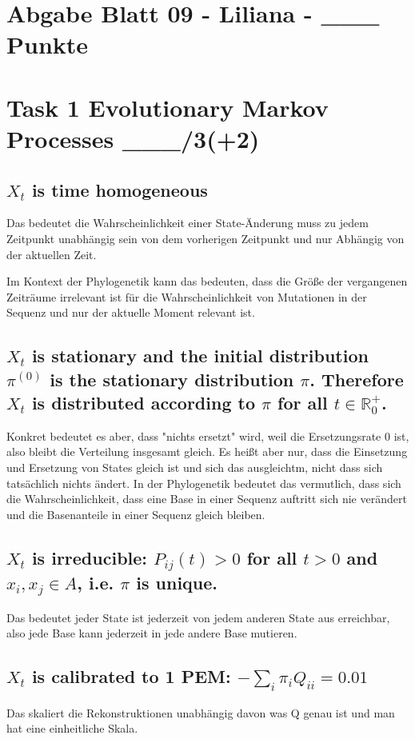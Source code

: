 \newpage \section{Abgabe Blatt 09 - Liliana - \_\_\_ Punkte}
\section*{Task 1 Evolutionary Markov Processes \_\_\_/3(+2)}
\subsection{$X_t$ is time homogeneous}
Das bedeutet die Wahrscheinlichkeit einer State-Änderung muss zu jedem Zeitpunkt unabhängig sein von dem vorherigen Zeitpunkt und nur Abhängig von der aktuellen Zeit. 

Im Kontext der Phylogenetik kann das bedeuten, dass die Größe der vergangenen Zeiträume irrelevant ist für die Wahrscheinlichkeit von Mutationen in der Sequenz und nur der aktuelle Moment relevant ist. 

\subsection{$X_t$ is stationary and the initial distribution $\pi^{(0)}$ is the stationary distribution $\pi$. Therefore $X_t$ is distributed according to $\pi$ for all $t \in \mathbb{R}^+_0$.}
Konkret bedeutet es aber, dass "nichts ersetzt" wird, weil die Ersetzungsrate 0 ist, also bleibt die Verteilung insgesamt gleich. Es heißt aber nur, dass die Einsetzung und Ersetzung von States gleich ist und sich das ausgleichtm, nicht dass sich tatsächlich nichts ändert. 
In der Phylogenetik bedeutet das vermutlich, dass sich die Wahrscheinlichkeit, dass eine Base in einer Sequenz auftritt sich nie verändert und die Basenanteile in einer Sequenz gleich bleiben. 


\subsection{$X_t$ is irreducible: $P_{ij} (t) > 0$ for all $t > 0$ and $x_i , x_j \in A$, i.e. $\pi$ is unique.}

Das bedeutet jeder State ist jederzeit von jedem anderen State aus erreichbar, also jede Base kann jederzeit in jede andere Base mutieren. 

\subsection{$X_t$ is calibrated to 1 PEM: $- \sum_i \pi_i Q_{ii} = 0.01$}
Das skaliert die Rekonstruktionen unabhängig davon was Q genau ist und man hat eine einheitliche Skala. 

